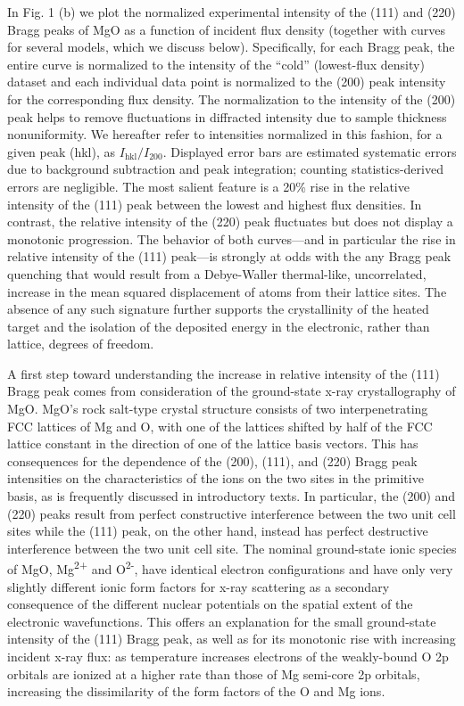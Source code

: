 In Fig. 1 (b) we plot the normalized experimental intensity of the (111)
and (220) Bragg peaks of MgO as a function of incident flux density
(together with curves for several models, which we discuss below).
Specifically, for each Bragg peak, the entire curve is normalized to the
intensity of the ``cold'' (lowest-flux density) dataset and each
individual data point is normalized to the (200) peak intensity for the
corresponding flux density. The normalization to the intensity of the
(200) peak helps to remove fluctuations in diffracted intensity due to
sample thickness nonuniformity. We hereafter refer to intensities
normalized in this fashion, for a given peak (hkl), as
\(I_{\text{hkl}}/I_{200}\). Displayed error bars are estimated
systematic errors due to background subtraction and peak integration;
counting statistics-derived errors are negligible. The most salient
feature is a 20\% rise in the relative intensity of the (111) peak
between the lowest and highest flux densities. In contrast, the relative
intensity of the (220) peak fluctuates but does not display a monotonic
progression. The behavior of both curves---and in particular the rise in
relative intensity of the (111) peak---is strongly at odds with the any
Bragg peak quenching that would result from a Debye-Waller thermal-like,
uncorrelated, increase in the mean squared displacement of atoms from
their lattice sites. The absence of any such signature further supports
the crystallinity of the heated target and the isolation of the
deposited energy in the electronic, rather than lattice, degrees of
freedom.

A first step toward understanding the increase in relative intensity of
the (111) Bragg peak comes from consideration of the ground-state x-ray
crystallography of MgO. MgO's rock salt-type crystal structure consists
of two interpenetrating FCC lattices of Mg and O, with one of the
lattices shifted by half of the FCC lattice constant in the direction of
one of the lattice basis vectors. This has consequences for the
dependence of the (200), (111), and (220) Bragg peak intensities on the
characteristics of the ions on the two sites in the primitive basis, as
is frequently discussed in introductory texts. \cite{kittel2005introduction} In particular,
the (200) and (220) peaks result from perfect constructive interference
between the two unit cell sites while the (111) peak, on the other hand,
instead has perfect destructive interference between the two unit cell
site. The nominal ground-state ionic species of MgO,
Mg\textsuperscript{2+} and O\textsuperscript{2-}, have identical
electron configurations and have only very slightly different ionic form
factors for x-ray scattering as a secondary consequence of the different
nuclear potentials on the spatial extent of the electronic
wavefunctions. This offers an explanation for the small ground-state
intensity of the (111) Bragg peak, as well as for its monotonic rise
with increasing incident x-ray flux: as temperature increases electrons
of the weakly-bound O 2p orbitals are ionized at a higher rate than
those of Mg semi-core 2p orbitals, increasing the dissimilarity of the
form factors of the O and Mg ions.

